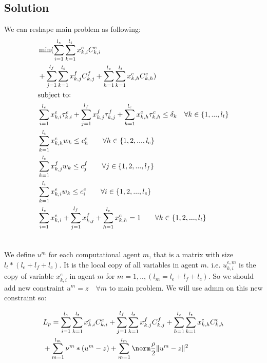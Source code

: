 \documentclass[conference]{IEEEtran}
\begin{document}
    \subsection{Solution}
    We can reshape main problem as following:
    \begin{subequations}
      \begin{align}
        &\min(\sum_{i=1}^{l_e} \sum_{k=1}^{l_t} x_{k,i}^e C_{k,i}^e \\ \notag
        &+\sum_{j=1}^{l_f} \sum_{k=1}^{l_t} x_{k,j}^f C_{k,j}^f
        +\sum_{h=1}^{l_c} \sum_{k=1}^{l_t} x_{k,h}^c C_{k,h}^c) \\ \notag
        &\text{subject to:} \\ \notag
        &\sum_{i=1}^{l_e}x_{k,i}^e\tau_{k,i}^e
        +\sum_{j=1}^{l_f}x_{k,j}^f\tau_{k,j}^f
        +\sum_{h=1}^{l_c}x_{k,h}^c\tau_{k,h}^c
        \le \delta_k \quad \forall k\in\{1,...,l_t\} \\ \notag
        &\sum_{k=1}^{l_t}x_{k,h}^c w_k \le c_h^c \quad\quad \forall h\in\{1,2,...,l_c\} \\ \notag
        &\sum_{k=1}^{l_t}x_{k,j}^f w_k \le c_j^f \quad\quad \forall j\in\{1,2,...,l_f\} \\ \notag
        &\sum_{k=1}^{l_t}x_{k,i}^e w_k \le c_i^e \quad\quad \forall i\in\{1,2,...,l_e\} \\ \notag
        &\sum_{i=1}^{l_e}x_{k,i}^e+\sum_{j=1}^{l_f}x_{k,j}^f+\sum_{h=1}^{l_c}x_{k,h}^c=1 \quad\quad
        \forall k\in\{1,2,...,l_t\} \\ \notag
      \end{align}
    \end{subequations}

    We define $u^m$ for each computational agent $m$, that is a matrix with size $l_t*(l_e+l_f+l_c)$.
    It is the local copy of all variables in agent $m$. i.e. $u_{k,i}^{e,m}$ is the copy of variable $x_{k,i}^e$
    in agent $m$ for $m=1,..,(l_m = l_e+l_f+l_c)$. So we should add new constraint $u^m = z \quad \forall m$ to main problem.
    We will use admm on this new constraint so:

    \begin{subequations}
      \begin{align}
        &L_p = \sum_{i=1}^{l_e} \sum_{k=1}^{l_t} x_{k,i}^e C_{k,i}^e
        +\sum_{j=1}^{l_f} \sum_{k=1}^{l_t} x_{k,j}^f C_{k,j}^f
        +\sum_{h=1}^{l_c} \sum_{k=1}^{l_t} x_{k,h}^c C_{k,h}^c \\ \notag
        &+\sum_{m=1}^{l_m} \nu^m*(u^m-z) + \sum_{m=1}^{l_m} \norm\frac{\rho}{2} \|u^m-z\|^2
      \end{align}
    \end{subequations}
\end{document}
